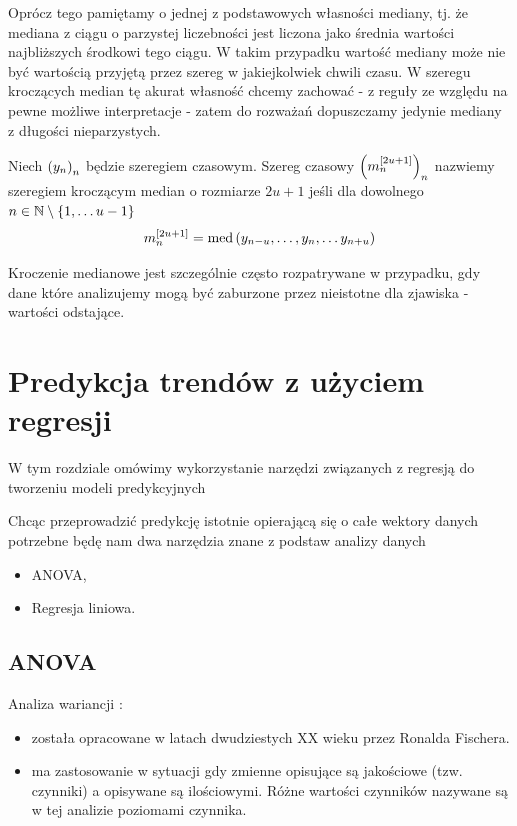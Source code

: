 \documentclass[10pt,a4paper]{book}
\begin{document}
Oprócz tego pamiętamy o jednej z podstawowych własności mediany, tj. że mediana z ciągu o parzystej liczebności jest liczona jako średnia wartości najbliższych środkowi tego ciągu. W takim przypadku wartość mediany może nie być wartością przyjętą przez szereg w jakiejkolwiek chwili czasu.  W szeregu kroczących median tę akurat własność chcemy zachować - z reguły ze względu na pewne możliwe interpretacje - zatem do rozważań dopuszczamy jedynie mediany z długości nieparzystych.

\begin{definition}
Niech $\left( {y_n} \right)_{n}^{} $ będzie szeregiem czasowym. Szereg czasowy $\left( {m^{[2u+1]}_n} \right)_{n}^{}$ nazwiemy szeregiem kroczącym median o rozmiarze $2u+1$ jeśli dla dowolnego $n \in \mathbb{N} \setminus \left\lbrace {1,\ldots u-1} \right\rbrace $
$$
m^{[2u+1]}_n = \median{y_{n-u}, \ldots, y_n, \ldots y_{n+u}}
$$  
\end{definition}

Kroczenie medianowe jest szczególnie często rozpatrywane w przypadku, gdy dane które analizujemy mogą być zaburzone przez nieistotne dla zjawiska - wartości odstające.   

\chapter{Predykcja trendów z użyciem regresji}

W tym rozdziale omówimy wykorzystanie narzędzi związanych z regresją do tworzeniu modeli predykcyjnych

Chcąc przeprowadzić predykcję istotnie opierającą się o całe wektory danych potrzebne będę nam dwa narzędzia znane z podstaw analizy danych
\begin{itemize}
\item ANOVA,
\item Regresja liniowa.
\end{itemize}

\section{ANOVA}

Analiza wariancji :
\begin{itemize}
\item została opracowane w latach dwudziestych XX wieku przez Ronalda Fischera. 
\item ma zastosowanie w sytuacji gdy zmienne opisujące są jakościowe (tzw. czynniki) a opisywane są ilościowymi.
Różne wartości czynników nazywane są w tej analizie poziomami czynnika.
\end{itemize} 
\end{document}

